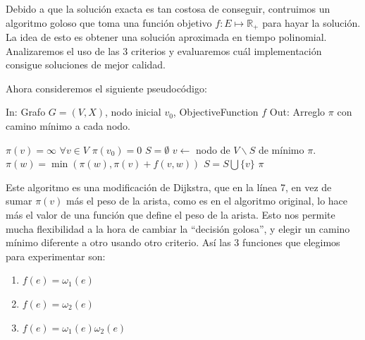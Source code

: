 \documentclass[11pt, a4paper, twoside]{article}
\begin{document}
{}

Debido a que la soluci\'on exacta es tan costosa de conseguir, contruimos un algoritmo goloso que toma una funci\'on objetivo $f: E  \mapsto \mathbb{R}_+$ para hayar la soluci\'on. La idea de esto es obtener una soluci\'on aproximada en tiempo polinomial. Analizaremos el uso de las 3 criterios y evaluaremos cu\'al implementaci\'on consigue soluciones de mejor calidad. 

Ahora consideremos el siguiente pseudoc\'odigo: 

\begin{algorithm}
In: Grafo $G = (V,X)$, nodo inicial $v_0$, ObjectiveFunction $f$ \newline
Out: Arreglo $\pi$ con camino m\'inimo a cada nodo. 
\begin{algorithmic}[1]
\State $\pi(v) = \infty$ \quad $\forall v \in V$
\State $\pi(v_0) = 0$
\State $S = \emptyset$
    \State $v \leftarrow $ nodo de $V\backslash S$ de m\'inimo $\pi$. 
      \State $\pi(w) = \min( \pi(w), \pi(v) + f(v,w))$
    \EndFor
    \State $S = S \bigcup \{v\}$
\EndFor
\Return $\pi$
\end{algorithmic}
\end{algorithm}

Este algoritmo es una modificaci\'on de Dijkstra, que en la l\'inea 7, en vez de sumar $\pi(v)$ m\'as el peso de la arista, como es en el algoritmo original, lo hace m\'as el valor de una funci\'on que define el peso de la arista. Esto nos permite mucha flexibilidad a la hora de cambiar la ``decisi\'on golosa'', y elegir un camino m\'inimo diferente a otro usando otro criterio. As\'i las 3 funciones que elegimos para experimentar son: 

\begin{enumerate}
 \item $f(e) = \omega_1(e)$
 \item $f(e) = \omega_2(e)$
 \item $f(e) = \omega_1(e)\omega_2(e)$
\end{enumerate}


\end{document}
